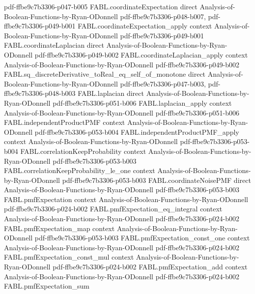 \begin{theorem}
  {pdf-ffbe9c7b3306-p047-b005}
\proofstep
  {FABL.coordinateExpectation}
  {direct}
  {Analysis-of-Boolean-Functions-by-Ryan-ODonnell}
  {pdf-ffbe9c7b3306-p048-b007,
    pdf-ffbe9c7b3306-p049-b001}
\proofstep
  {FABL.coordinateExpectation_apply}
  {context}
  {Analysis-of-Boolean-Functions-by-Ryan-ODonnell}
  {pdf-ffbe9c7b3306-p049-b001}
\proofstep
  {FABL.coordinateLaplacian}
  {direct}
  {Analysis-of-Boolean-Functions-by-Ryan-ODonnell}
  {pdf-ffbe9c7b3306-p049-b002}
\proofstep
  {FABL.coordinateLaplacian_apply}
  {context}
  {Analysis-of-Boolean-Functions-by-Ryan-ODonnell}
  {pdf-ffbe9c7b3306-p049-b002}
\proofstep
  {FABL.sq_discreteDerivative_toReal_eq_self_of_monotone}
  {direct}
  {Analysis-of-Boolean-Functions-by-Ryan-ODonnell}
  {pdf-ffbe9c7b3306-p047-b003,
    pdf-ffbe9c7b3306-p048-b003}
\proofstep
  {FABL.laplacian}
  {direct}
  {Analysis-of-Boolean-Functions-by-Ryan-ODonnell}
  {pdf-ffbe9c7b3306-p051-b006}
\proofstep
  {FABL.laplacian_apply}
  {context}
  {Analysis-of-Boolean-Functions-by-Ryan-ODonnell}
  {pdf-ffbe9c7b3306-p051-b006}
\proofstep
  {FABL.independentProductPMF}
  {context}
  {Analysis-of-Boolean-Functions-by-Ryan-ODonnell}
  {pdf-ffbe9c7b3306-p053-b004}
\proofstep
  {FABL.independentProductPMF_apply}
  {context}
  {Analysis-of-Boolean-Functions-by-Ryan-ODonnell}
  {pdf-ffbe9c7b3306-p053-b004}
\proofstep
  {FABL.correlationKeepProbability}
  {context}
  {Analysis-of-Boolean-Functions-by-Ryan-ODonnell}
  {pdf-ffbe9c7b3306-p053-b003}
\proofstep
  {FABL.correlationKeepProbability_le_one}
  {context}
  {Analysis-of-Boolean-Functions-by-Ryan-ODonnell}
  {pdf-ffbe9c7b3306-p053-b003}
\proofstep
  {FABL.coordinateNoisePMF}
  {direct}
  {Analysis-of-Boolean-Functions-by-Ryan-ODonnell}
  {pdf-ffbe9c7b3306-p053-b003}
\proofstep
  {FABL.pmfExpectation}
  {context}
  {Analysis-of-Boolean-Functions-by-Ryan-ODonnell}
  {pdf-ffbe9c7b3306-p024-b002}
\proofstep
  {FABL.pmfExpectation_eq_integral}
  {context}
  {Analysis-of-Boolean-Functions-by-Ryan-ODonnell}
  {pdf-ffbe9c7b3306-p024-b002}
\proofstep
  {FABL.pmfExpectation_map}
  {context}
  {Analysis-of-Boolean-Functions-by-Ryan-ODonnell}
  {pdf-ffbe9c7b3306-p053-b003}
\proofstep
  {FABL.pmfExpectation_const_one}
  {context}
  {Analysis-of-Boolean-Functions-by-Ryan-ODonnell}
  {pdf-ffbe9c7b3306-p024-b002}
\proofstep
  {FABL.pmfExpectation_const_mul}
  {context}
  {Analysis-of-Boolean-Functions-by-Ryan-ODonnell}
  {pdf-ffbe9c7b3306-p024-b002}
\proofstep
  {FABL.pmfExpectation_add}
  {context}
  {Analysis-of-Boolean-Functions-by-Ryan-ODonnell}
  {pdf-ffbe9c7b3306-p024-b002}
\proofstep
  {FABL.pmfExpectation_sum}

\end{theorem}
